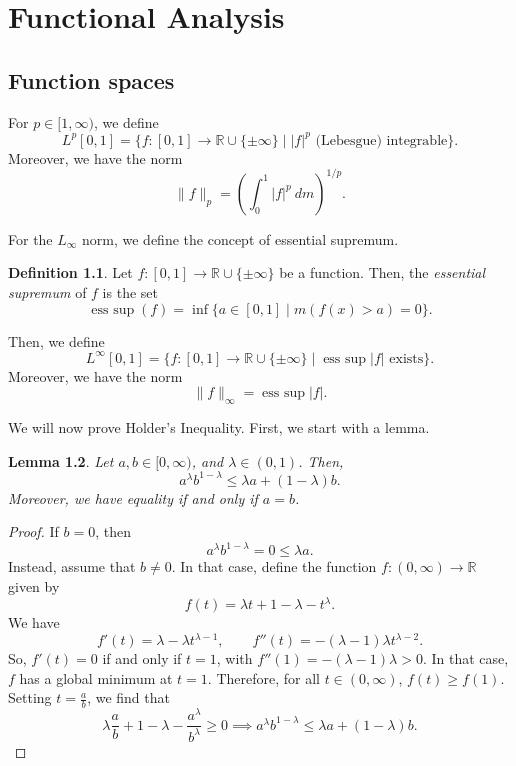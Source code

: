 \documentclass[a4paper, openany]{memoir}
\newcommand{\esup}{\operatorname{ess \ sup}}
\theoremstyle{definition}
\newtheorem{definition}{Definition}[section]
\theoremstyle{plain}
\newtheorem{lemma}[definition]{Lemma}
\begin{document}
    \chapter{Functional Analysis}
    \section{Function spaces}
    For $p \in [1, \infty)$, we define
    \[L^{p}[0, 1] = \{f: [0, 1] \to \mathbb{R} \cup \{\pm \infty\} \mid |f|^p \text{ (Lebesgue) integrable}\}.\]
    Moreover, we have the norm
    \[\lVert f \rVert_p = \left(\int_0^1 |f|^p \ dm\right)^{1/p}.\]
    
    For the $L_\infty$ norm, we define the concept of essential supremum.
    \begin{definition}
        Let $f: [0, 1] \to \mathbb{R} \cup \{\pm \infty\}$ be a function. Then, the \emph{essential supremum} of $f$ is the set
        \[\esup (f) = \inf \{a \in [0, 1] \mid m(f(x) > a) = 0\}.\]
    \end{definition}
    
    Then, we define 
    \[L^\infty [0, 1] = \{f: [0, 1] \to \mathbb{R} \cup \{\pm \infty\} \mid \esup |f| \text{ exists}\}.\]
    Moreover, we have the norm
    \[\lVert f \rVert_\infty = \esup |f|.\]


    We will now prove Holder's Inequality. First, we start with a lemma.
    \begin{lemma}
        Let $a, b \in [0, \infty)$, and $\lambda \in (0, 1)$. Then,
        \[a^\lambda b^{1-\lambda} \leq \lambda a + (1 - \lambda) b.\]
        Moreover, we have equality if and only if $a = b$.
    \end{lemma}
    \begin{proof}
        If $b = 0$, then 
        \[a^\lambda b^{1 - \lambda} = 0 \leq \lambda a.\]
        Instead, assume that $b \neq 0$. In that case, define the function $f: (0, \infty) \to \mathbb{R}$ given by
        \[f(t) = \lambda t + 1 -\lambda - t^\lambda.\]
        We have
        \[f'(t) = \lambda - \lambda t^{\lambda -1}, \qquad f''(t) = -(\lambda - 1)\lambda t^{\lambda-2}.\]
        So, $f'(t) = 0$ if and only if $t = 1$, with $f''(1) = -(\lambda - 1)\lambda > 0$. In that case, $f$ has a global minimum at $t = 1$. Therefore, for all $t \in (0, \infty)$, $f(t) \geq f(1)$. Setting $t = \frac{a}{b}$, we find that
        \[\lambda \frac{a}{b} + 1 - \lambda - \frac{a^\lambda}{b^\lambda} \geq 0 \implies a^\lambda b^{1-\lambda} \leq \lambda a + (1 - \lambda) b.\]
    \end{proof}
\end{document}
